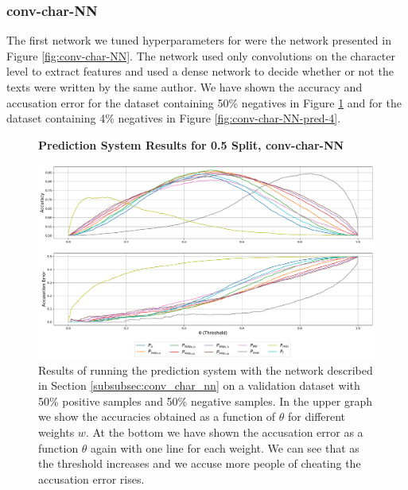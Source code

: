 \subsubsection{\glsdesc{conv-char-NN}}
\label{subsubsec:prediction_system_conv-char-NN}

The first network we tuned hyperparameters for were the network presented
in Figure \ref{fig:conv-char-NN}. The network used only convolutions on the
character level to extract features and used a dense network to decide whether
or not the texts were written by the same author. We have shown the accuracy
and accusation error for the dataset containing 50\% negatives in Figure
\ref{fig:conv-char-NN-pred-50} and for the dataset containing 4\% negatives in
Figure \ref{fig:conv-char-NN-pred-4}.

\begin{figure}
    \centering
    \textbf{Prediction System Results for 0.5 Split, \glsdesc{conv-char-NN}}\par\medskip
    \includegraphics[scale=0.33]{./pictures/experiments/conv_char_nn/prediction_system_50}
    \caption{Results of running the prediction system with the network described
        in Section \ref{subsubsec:conv_char_nn} on a validation dataset with
        50\% positive samples and 50\% negative samples. In the upper graph we
        show the accuracies obtained as a function of $\theta$ for different
        weights $w$. At the bottom we have shown the accusation error as a
        function $\theta$ again with one line for each weight. We can see that
        as the threshold increases and we accuse more people of cheating the
        accusation error rises.}
    \label{fig:conv-char-NN-pred-50}
\end{figure}

